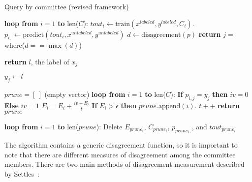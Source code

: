 \tablespacing
\begin{algorithm}[H]
	\caption{Query by committee (revised framework)}\label{euclid}
	\begin{algorithmic}[1]
		
		\State \textbf{loop from} $i=1$ \textbf{to} len($C$):
		\State \indent $\textit{tout}_i \gets 
		\text{train}(x^{labeled},y^{labeled},C_i)$.
		\State \indent $p_{i,} \gets 
		\text{predict}(\textit{tout}_i,x^{unlabeled},y^{unlabeled})$
		\State $d \gets \text{disagreement}(p)$
		\State \textbf{return} $j =$ where($d==\max{(d)}$)
		\EndFunction
		
		\State \textbf{return} $l$, the label of $x_j$
		\EndFunction
		
		\State $y_j \gets l$
		
		\State $prune = [\ ]$ (empty vector)	
		\State \textbf{loop from} $i=1$ \textbf{to} len($C$):
		\State \indent \textbf{If} $p_{i,j}=y_j$ \textbf{then} $iv = 0$ 
		\textbf{Else} $iv = 1$
		\State \indent $E_i = E_i + \frac{iv - E_i}{t}$
		\State \indent \textbf{If} $E_i>\epsilon$ \textbf{then} 
		$prune.\text{append}(i)$. 
		\State $t++$
		\State \textbf{return} $prune$
		\EndFunction
		
		\State \textbf{loop from} $i=1$ \textbf{to} len($prune$):
		\State \indent Delete $E_{prune_i}$, $C_{prune_i}$, $p_{prune_i,}$, 
		and $\textit{tout}_{prune_i}$
		
		\EndProcedure
	\end{algorithmic}
\end{algorithm}
\bodyspacing

The algorithm contains a generic disagreement function, so it is important to 
note that there are different measures of disagreement among the committee 
members. There are two main methods of disagreement 
measurement described by Settles~\cite{settles2010}:

